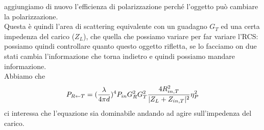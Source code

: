 \documentclass[oneside, 12pt]{extbook}
\DeclarePairedDelimiter{\abs}{\lvert}{\rvert}
\begin{document}
aggiungiamo di nuovo l'efficienza di polarizzazione perché l'oggetto può cambiare la polarizzazione.\\Questa è quindi l'area di scattering equivalente con un guadagno $G_T$ ed una certa impedenza del carico ($Z_L$), che  quella che possiamo variare per far variare l'RCS: possiamo quindi controllare quanto questo oggetto rifletta, se lo facciamo on due stati cambia l'informazione che torna indietro e quindi possiamo mandare informazione.\\Abbiamo che
\begin{equation}
	P_{R \leftarrow T} = (\frac{\lambda}{4 \pi d})^4 P_{in} G_R^2 G_T^2 \dfrac{4 R_{in,T}^2}{\abs{Z_L + Z_{in,T}}^2} \eta_P^2	
\end{equation} 
ci interessa che l'equazione sia dominabile andando ad agire sull'impedenza del carico.
\end{document}
